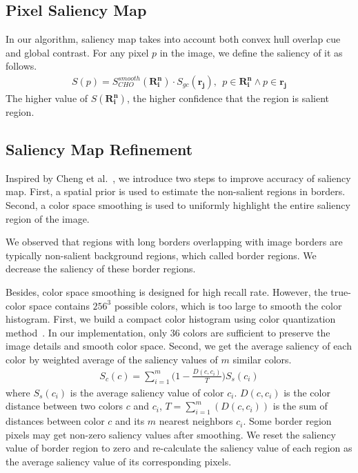 \documentclass{article}
\begin{document}
\subsection{Pixel Saliency Map}
In our algorithm, saliency map takes into account both convex hull overlap cue and global contrast. For any pixel $p$ in the image, we define the saliency of it as follows.
\begin{eqnarray}
	S(p) = S_{CHO}^{smooth}(\mathbf{R_i^n})\cdot S_{gc}(\mathbf{r_j}),~~p\in \mathbf{R_i^n} \wedge p\in\mathbf{r_j}
\end{eqnarray}
The higher value of $S(\mathbf{R_i^n})$, the higher confidence that the region is salient region.

\subsection{Saliency Map Refinement}
Inspired by Cheng et al.~\cite{cheng2015global}, we introduce two steps to improve accuracy of saliency map. First, a spatial prior is used to estimate the non-salient regions in borders. Second, a color space smoothing is used to uniformly highlight the entire saliency region of the image.

We observed that regions with long borders overlapping with image borders are typically non-salient background regions, which called border regions. We decrease the saliency of these border regions.

Besides, color space smoothing is designed for high recall rate. However, the true-color space contains $256^3$ possible colors, which is too large to smooth the color histogram. First, we build a compact color histogram using color quantization method~\cite{heckbert1982color}. In our implementation, only $36$ colors are sufficient to preserve the image details and smooth color space. Second, we get the average saliency of each color by weighted average of the saliency values of $m$ similar colors.
\begin{eqnarray}
	S_c(c) = \sum_{i=1}^m\big(1-\frac{D(c,c_i)}{T}\big)S_s(c_i)
\end{eqnarray}
where $S_s(c_i)$ is the average saliency value of color $c_i$. $D(c,c_i)$ is the color distance between two colors $c$ and $c_i$, $T = \sum_{i=1}^m(D(c,c_i))$ is the sum of distances between color $c$ and its $m$ nearest neighbors $c_i$. Some border region pixels may get non-zero saliency values after smoothing. We reset the saliency value of border region to zero and re-calculate the saliency value of each region as the average saliency value of its corresponding pixels.
\end{document}
